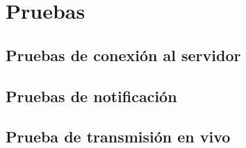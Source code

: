 \chapter{Pruebas}

\section{Pruebas de conexión al servidor}

\section{Pruebas de notificación}

\section{Prueba de transmisión en vivo}



